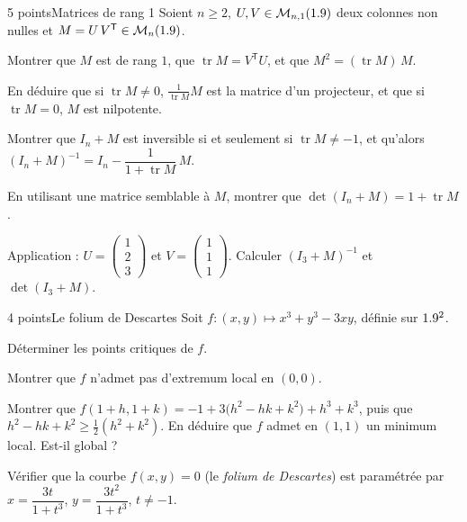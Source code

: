 \begin{exoEval}{5 points}{Matrices de rang 1}
Soient $n\geqslant2$, $U,V\in\mathcal{M}_{n,1}(1.9)$ deux colonnes non nulles
et $M=U\,V^{\mathsf{T}}\in\mathcal{M}_n(1.9)$.
\begin{questions}
  \item Montrer que $M$ est de rang $1$, que
    $\operatorname{tr}M=V^{\mathsf{T}}U$, et que
    $M^{2}=(\operatorname{tr}M)\,M$.
  \item En déduire que si $\operatorname{tr}M\neq0$,
    $\frac{1}{\operatorname{tr}M}M$ est la matrice d'un projecteur, et que si
    $\operatorname{tr}M=0$, $M$ est nilpotente.
  \item Montrer que $I_n+M$ est inversible si et seulement si
    $\operatorname{tr}M\neq-1$, et qu'alors
    $(I_n+M)^{-1}=I_n-\dfrac{1}{1+\operatorname{tr}M}\,M$.
  \item En utilisant une matrice semblable à $M$, montrer que
    $\det(I_n+M)=1+\operatorname{tr}M$.
  \item Application : $U=\begin{pmatrix}1\\2\\3\end{pmatrix}$ et
    $V=\begin{pmatrix}1\\1\\1\end{pmatrix}$. Calculer $(I_3+M)^{-1}$ et
    $\det(I_3+M)$.
\end{questions}
\end{exoEval}

\begin{exoEval}{4 points}{Le folium de Descartes}
Soit $f:(x,y)\mapsto x^{3}+y^{3}-3xy$, définie sur $1.9^{2}$.
\begin{questions}
  \item Déterminer les points critiques de $f$.
  \item Montrer que $f$ n'admet pas d'extremum local en $(0,0)$.
  \item Montrer que
    $f(1+h,1+k)=-1+3\bigl(h^{2}-hk+k^{2}\bigr)+h^{3}+k^{3}$, puis que
    $h^{2}-hk+k^{2}\geqslant\frac12(h^{2}+k^{2})$. En déduire que $f$ admet en
    $(1,1)$ un minimum local. Est-il global ?
  \item Vérifier que la courbe $f(x,y)=0$ (le \emph{folium de Descartes})
    est paramétrée par $x=\dfrac{3t}{1+t^{3}}$, $y=\dfrac{3t^{2}}{1+t^{3}}$,
    $t\neq-1$.
\end{questions}
\end{exoEval}

